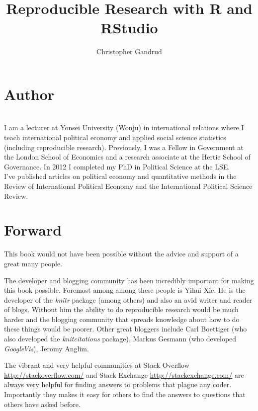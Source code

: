 \documentclass[ChapterTOCs,krantz1]{krantz}\usepackage{graphicx, color}
\begin{document}
\title{Reproducible Research with R and RStudio}

\author{Christopher Gandrud}

\maketitle

\frontmatter

{\chapter*{Author}}

 \\[1cm]

\noindent I am a lecturer at Yonsei University (Wonju) in international relations where I teach international political economy and applied social science statistics (including reproducible research). Previously, I was a Fellow in Government at the London School of Economics and a research associate at the Hertie School of Governance. In 2012 I completed my PhD in Political Science at the LSE. \\[0.25cm]

\noindent I've published articles on political economy and quantitative methods in the Review of International Political Economy and the International Political Science Review.




\chapter*{Forward}

This book would not have been possible without the advice and support of a great many people.

The developer and blogging community has been incredibly important for making this book possible. Foremost among among these people is Yihui Xie. He is the developer of the {\emph{knitr}} package (among others) and also an avid writer and reader of blogs. Without him the ability to do reproducible research would be much harder and the blogging community that spreads knowledge about how to do these things would be poorer. Other great bloggers include Carl Boettiger (who also developed the {\emph{knitcitations}} package), Markus Gesmann (who developed {\emph{GoogleVis}}), Jeromy Anglim.

The vibrant and very helpful communities at Stack Overflow \url{http://stackoverflow.com/} and Stack Exchange \url{http://stackexchange.com/} are always very helpful for finding answers to problems that plague any coder. Importantly they makes it easy for others to find the answers to questions that others have asked before.
\end{document}
